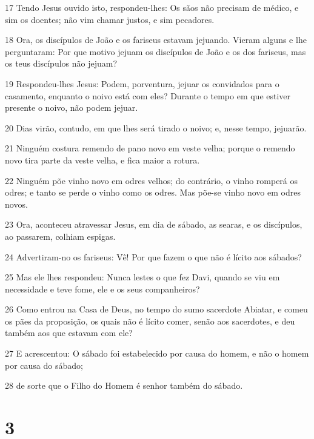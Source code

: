 \par 17 Tendo Jesus ouvido isto, respondeu-lhes: Os sãos não precisam de médico, e sim os doentes; não vim chamar justos, e sim pecadores.
\par 18 Ora, os discípulos de João e os fariseus estavam jejuando. Vieram alguns e lhe perguntaram: Por que motivo jejuam os discípulos de João e os dos fariseus, mas os teus discípulos não jejuam?
\par 19 Respondeu-lhes Jesus: Podem, porventura, jejuar os convidados para o casamento, enquanto o noivo está com eles? Durante o tempo em que estiver presente o noivo, não podem jejuar.
\par 20 Dias virão, contudo, em que lhes será tirado o noivo; e, nesse tempo, jejuarão.
\par 21 Ninguém costura remendo de pano novo em veste velha; porque o remendo novo tira parte da veste velha, e fica maior a rotura.
\par 22 Ninguém põe vinho novo em odres velhos; do contrário, o vinho romperá os odres; e tanto se perde o vinho como os odres. Mas põe-se vinho novo em odres novos.
\par 23 Ora, aconteceu atravessar Jesus, em dia de sábado, as searas, e os discípulos, ao passarem, colhiam espigas.
\par 24 Advertiram-no os fariseus: Vê! Por que fazem o que não é lícito aos sábados?
\par 25 Mas ele lhes respondeu: Nunca lestes o que fez Davi, quando se viu em necessidade e teve fome, ele e os seus companheiros?
\par 26 Como entrou na Casa de Deus, no tempo do sumo sacerdote Abiatar, e comeu os pães da proposição, os quais não é lícito comer, senão aos sacerdotes, e deu também aos que estavam com ele?
\par 27 E acrescentou: O sábado foi estabelecido por causa do homem, e não o homem por causa do sábado;
\par 28 de sorte que o Filho do Homem é senhor também do sábado.

\chapter{3}

